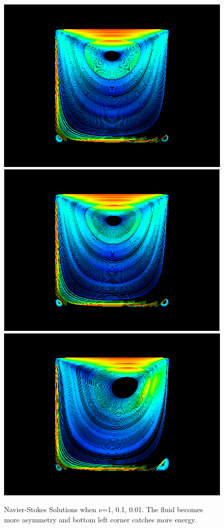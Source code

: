 \documentclass[a4paper]{article}
\begin{document}
\begin{figure}[h]
\centering
\includegraphics[scale = 0.2]{images/a.png}
\includegraphics[scale = 0.2]{images/b.png}
\includegraphics[scale = 0.2]{images/c.png}
\caption{Navier-Stokes Solutions when $\nu$=1, 0.1, 0.01. The fluid becomes more asymmetry and bottom left corner catches more energy.}
\label{im::Navier-Stoke-solution}
\end{figure}
\end{document}
